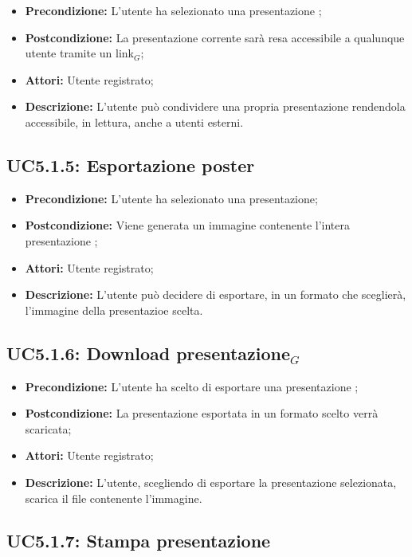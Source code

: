 \begin{itemize}
	\item \textbf{Precondizione:} L'utente ha selezionato una presentazione ;
	\item \textbf{Postcondizione:} La presentazione corrente sarà resa accessibile a qualunque utente tramite un link$_G$;
	\item \textbf{Attori:} Utente registrato;
	\item \textbf{Descrizione:} L'utente può condividere una propria presentazione rendendola accessibile, in lettura, anche a utenti esterni.
\end{itemize}
\subsection{ UC5.1.5: Esportazione poster}

\begin{itemize}
	\item \textbf{Precondizione:} L'utente ha selezionato una presentazione;
	\item \textbf{Postcondizione:} Viene generata un immagine contenente l'intera presentazione ;
	\item \textbf{Attori:} Utente registrato;
	\item \textbf{Descrizione:} L'utente può decidere di esportare, in un formato che sceglierà, l'immagine della presentazioe scelta.
\end{itemize}
\subsection{ UC5.1.6: Download presentazione$_G$}

\begin{itemize}
	\item \textbf{Precondizione:} L'utente ha scelto di esportare una presentazione ;
	\item \textbf{Postcondizione:} La presentazione esportata in un formato scelto verrà scaricata;
	\item \textbf{Attori:} Utente registrato;
	\item \textbf{Descrizione:} L'utente, scegliendo di esportare la presentazione selezionata, scarica il file contenente l'immagine.
\end{itemize}
\subsection{ UC5.1.7: Stampa presentazione }

